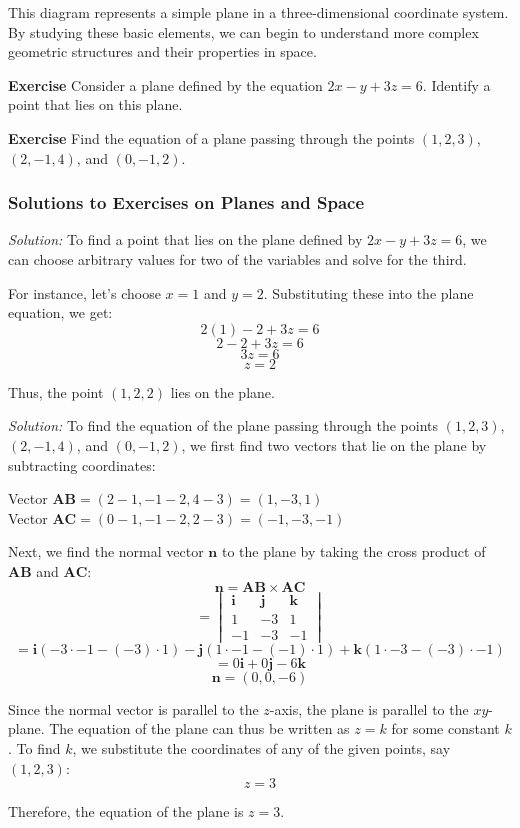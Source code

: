 \documentclass[a4paper,12pt]{book}
\newenvironment{exercise}[1][]
  {\par\medskip\noindent\textbf{Exercise #1} \rmfamily}
  {\medskip}
\newenvironment{solution}[1][]
{\par\noindent\textit{Solution:} \rmfamily}{\medskip}
\begin{document}
This diagram represents a simple plane in a three-dimensional coordinate system. By studying these basic elements, we can begin to understand more complex geometric structures and their properties in space.

\begin{exercise}
  Consider a plane defined by the equation \(2x - y + 3z = 6\). Identify a point that lies on this plane.
\end{exercise}

\begin{exercise}
  Find the equation of a plane passing through the points \( (1, 2, 3) \), \( (2, -1, 4) \), and \( (0, -1, 2) \).
\end{exercise}


\subsubsection*{Solutions to Exercises on Planes and Space}

\begin{solution}[Exercise 1]
To find a point that lies on the plane defined by \(2x - y + 3z = 6\), we can choose arbitrary values for two of the variables and solve for the third. 

For instance, let's choose \(x = 1\) and \(y = 2\). Substituting these into the plane equation, we get:
\[ 2(1) - 2 + 3z = 6 \]
\[ 2 - 2 + 3z = 6 \]
\[ 3z = 6 \]
\[ z = 2 \]

Thus, the point \((1, 2, 2)\) lies on the plane.
\end{solution}

\begin{solution}[Exercise 2]
To find the equation of the plane passing through the points \( (1, 2, 3) \), \( (2, -1, 4) \), and \( (0, -1, 2) \), we first find two vectors that lie on the plane by subtracting coordinates:

Vector \(\mathbf{AB} = (2 - 1, -1 - 2, 4 - 3) = (1, -3, 1)\) \\
Vector \(\mathbf{AC} = (0 - 1, -1 - 2, 2 - 3) = (-1, -3, -1)\)

Next, we find the normal vector \(\mathbf{n}\) to the plane by taking the cross product of \(\mathbf{AB}\) and \(\mathbf{AC}\):
\[ \mathbf{n} = \mathbf{AB} \times \mathbf{AC} \]
\[ = \begin{vmatrix} \mathbf{i} & \mathbf{j} & \mathbf{k} \\ 1 & -3 & 1 \\ -1 & -3 & -1 \end{vmatrix} \]
\[ = \mathbf{i}(-3 \cdot -1 - (-3) \cdot 1) - \mathbf{j}(1 \cdot -1 - (-1) \cdot 1) + \mathbf{k}(1 \cdot -3 - (-3) \cdot -1) \]
\[ = 0\mathbf{i} + 0\mathbf{j} - 6\mathbf{k} \]
\[ \mathbf{n} = (0, 0, -6) \]

Since the normal vector is parallel to the \(z\)-axis, the plane is parallel to the \(xy\)-plane. The equation of the plane can thus be written as \( z = k \) for some constant \( k \). To find \( k \), we substitute the coordinates of any of the given points, say \( (1, 2, 3) \):
\[ z = 3 \]

Therefore, the equation of the plane is \( z = 3 \).
\end{solution}
\end{document}
